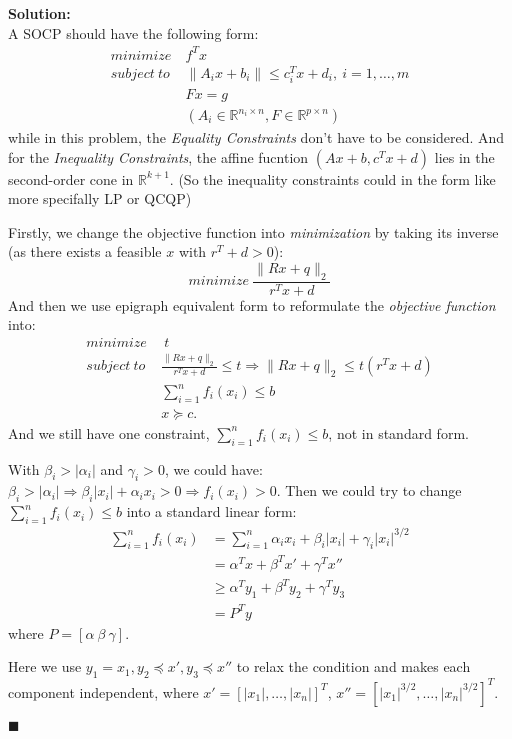 \documentclass{article}
\newenvironment{solution}                               %
{\textbf{Solution:} \\}{$\blacksquare$\newline}         %
\newcommand{\leadto}{\Rightarrow}                       %
\newcommand{\domR}{\mathbb{R}}                          %
\newcommand{\abss}[1]{\| #1 \|}                         %
\begin{document}
\begin{solution}
    A SOCP should have the following form:
    \begin{align*}
        minimize\ &f^T x \\
        subject\ to\ &\abss{A_i x + b_i} \leq c_i^T x + d_i,\ i=1,\dots,m \\
        &Fx = g \\
        &(A_i \in \domR^{n_i \times n}, F \in \domR^{p \times n})
    \end{align*}
    while in this problem, the \textit{Equality Constraints} don't have to be considered. And for the \textit{Inequality Constraints}, the affine fucntion $(Ax+b, c^T x + d)$ lies in the second-order cone in $\domR^{k+1}$. (So the inequality constraints could in the form like more specifally LP or QCQP)

    Firstly, we change the objective function into \textit{minimization} by taking its inverse (as there exists a feasible $x$ with $r^T + d > 0$):
    \[
        minimize\ \frac{\abss{Rx+q}_2}{r^T x+d}
    \]
    And then we use epigraph equivalent form to reformulate the \textit{objective function} into:
    \begin{align*}
        minimize\ &\ t \\
        subject\ to\ &\frac{\abss{Rx+q}_2}{r^T x + d} \leq t
                        \leadto {\abss{Rx+q}_2} \leq {t(r^T x + d)} \\
        &\sum_{i=1}^{n} f_i(x_i) \leq b \\
        &x \succeq c.
    \end{align*}
    And we still have one constraint, $\sum_{i=1}^{n} f_i(x_i) \leq b$, not in standard form.

    With $\beta_i > |\alpha_i|$ and $\gamma_i >0$, we could have:
    $\beta_i > |\alpha_i| \leadto \beta_i |x_i| + \alpha_i x_i > 0 \leadto f_i(x_i) > 0$.
    Then we could try to change $\sum_{i=1}^{n} f_i(x_i) \leq b$ into a standard linear form:
    \begin{align*}
        \sum_{i=1}^n f_i(x_i) &= \sum_{i=1}^n \alpha_i x_i + \beta_i |x_i| + \gamma_i |x_i|^{3/2} \\
        &= \alpha^T x + \beta^T x' + \gamma^T x'' \\
        &\geq \alpha^T y_1 + \beta^T y_2 + \gamma^T y_3 \\
        &= P^T y
    \end{align*}
    where $P=[\alpha\ \beta\ \gamma]$.
    
    Here we use $y_1=x_1, y_2 \preceq x', y_3  \preceq x''$ to relax the condition and makes each component independent, where $x'=[|x_1|, \dots, |x_n|]^T$, $x''=[|x_1|^{3/2}, \dots, |x_n|^{3/2}]^T$.


\end{solution}
\end{document}
